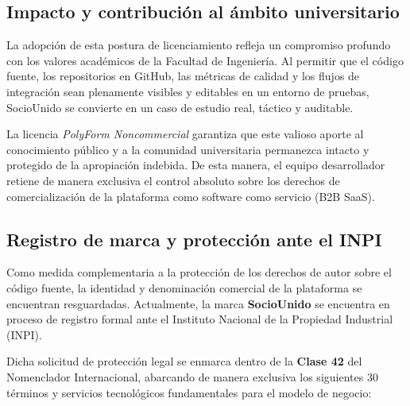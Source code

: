 \subsection{Impacto y contribución al ámbito universitario}

La adopción de esta postura de licenciamiento refleja un compromiso profundo con los valores académicos de la Facultad de Ingeniería. Al permitir que el código fuente, los repositorios en GitHub, las métricas de calidad y los flujos de integración sean plenamente visibles y editables en un entorno de pruebas, SocioUnido se convierte en un caso de estudio real, táctico y auditable. 

La licencia \textit{PolyForm Noncommercial} garantiza que este valioso aporte al conocimiento público y a la comunidad universitaria permanezca intacto y protegido de la apropiación indebida. De esta manera, el equipo desarrollador retiene de manera exclusiva el control absoluto sobre los derechos de comercialización de la plataforma como software como servicio (B2B SaaS).

\subsection{Registro de marca y protección ante el INPI}

Como medida complementaria a la protección de los derechos de autor sobre el código fuente, la identidad y denominación comercial de la plataforma se encuentran resguardadas. Actualmente, la marca \textbf{SocioUnido} se encuentra en proceso de registro formal ante el Instituto Nacional de la Propiedad Industrial (INPI).

Dicha solicitud de protección legal se enmarca dentro de la \textbf{Clase 42} del Nomenclador Internacional, abarcando de manera exclusiva los siguientes 30 términos y servicios tecnológicos fundamentales para el modelo de negocio:

